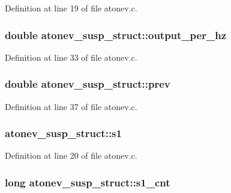 Definition at line 19 of file atonev.\+c.

\subsubsection[{\texorpdfstring{output\+\_\+per\+\_\+hz}{output_per_hz}}]{\setlength{\rightskip}{0pt plus 5cm}double atonev\+\_\+susp\+\_\+struct\+::output\+\_\+per\+\_\+hz}\hypertarget{structatonev__susp__struct_a3e89e24064d8b4a4915b81973734a7d3}{}\label{structatonev__susp__struct_a3e89e24064d8b4a4915b81973734a7d3}


Definition at line 33 of file atonev.\+c.

\subsubsection[{\texorpdfstring{prev}{prev}}]{\setlength{\rightskip}{0pt plus 5cm}double atonev\+\_\+susp\+\_\+struct\+::prev}\hypertarget{structatonev__susp__struct_a3ac8868bdaa151660c17a68229bbca2b}{}\label{structatonev__susp__struct_a3ac8868bdaa151660c17a68229bbca2b}


Definition at line 37 of file atonev.\+c.

\subsubsection[{\texorpdfstring{s1}{s1}}]{ atonev\+\_\+susp\+\_\+struct\+::s1}\hypertarget{structatonev__susp__struct_a9479b5d4cc27f29a4ffeeb42fb7bc897}{}\label{structatonev__susp__struct_a9479b5d4cc27f29a4ffeeb42fb7bc897}


Definition at line 20 of file atonev.\+c.

\subsubsection[{\texorpdfstring{s1\+\_\+cnt}{s1_cnt}}]{\setlength{\rightskip}{0pt plus 5cm}long atonev\+\_\+susp\+\_\+struct\+::s1\+\_\+cnt}\hypertarget{structatonev__susp__struct_ac68de00912f7708b31b5a465c865c2bb}{}\label{structatonev__susp__struct_ac68de00912f7708b31b5a465c865c2bb}


